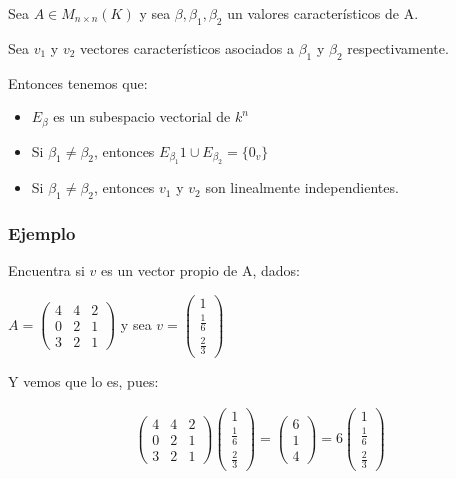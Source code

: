 \documentclass[12pt]{report}                                    %
\begin{document}
        Sea $A \in M_{n \times n} (K)$ y sea $\beta ,\beta_1, \beta_2$ un valores característicos de A.

        Sea $v_1$ y $v_2$ vectores característicos asociados a $\beta_1$ y $\beta_2$ respectivamente.

        Entonces tenemos que:

        \begin{itemize}  
            \item $E_{\beta}$ es un subespacio vectorial de $k^n$
            \item Si $\beta_1 \neq \beta_2$, entonces $E_{\beta_1} 1 \cup E_{\beta_2} = \{0_v\}$
            \item Si $\beta_1 \neq \beta_2$, entonces $v_1$ y $v_2$ son linealmente independientes.
        \end{itemize}  


            \clearpage
            \subsubsection{Ejemplo}
            Encuentra si $v$ es un vector propio de A, dados:

            $A = \begin{pmatrix}4&4&2\\0&2&1\\3&2&1\end{pmatrix}$ y sea 
            $v = \begin{pmatrix}1\\\frac{1}{6}\\\frac{2}{3}\end{pmatrix}$

            Y vemos que lo es, pues:

            \begin{equation*}
            \begin{split}
                \begin{pmatrix}4&4&2\\0&2&1\\3&2&1\end{pmatrix}
                \begin{pmatrix}1\\\frac{1}{6}\\\frac{2}{3}\end{pmatrix} =
                \begin{pmatrix}6\\1\\4\end{pmatrix} =
                6\begin{pmatrix}1\\\frac{1}{6}\\\frac{2}{3}\end{pmatrix}
            \end{split}
            \end{equation*}
        
\end{document}
